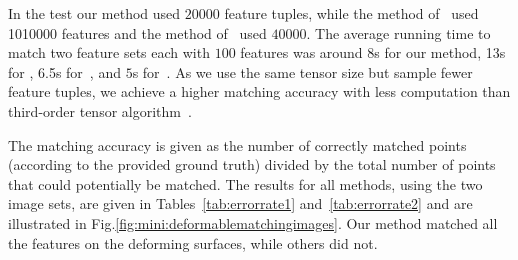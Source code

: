 In the test our method used $20000$ feature tuples, while the method of~\cite{Duchenne09} used 1010000 features  and the method of~\cite{Zass08} used $40000$.
The average running time to match two feature sets each with $100$ features was around 8s for our method, 13s for \cite{Duchenne09}, 6.5s for~\cite{Zass08}, and $5$s for~\cite{Cour06}.
As we use the same tensor size but sample fewer feature tuples, we achieve a higher matching accuracy with less computation than third-order tensor algorithm~\cite{Duchenne09}.

The matching accuracy is given as the number of correctly matched points (according to the provided ground truth) divided by the total number of points that could potentially be matched. 
The results for all methods, using the two image sets, are given in Tables~\ref{tab:errorrate1} and~\ref{tab:errorrate2} and are illustrated in Fig.\ref{fig:mini:deformablematchingimages}. 
Our method matched all the features on the deforming surfaces, while others did not.

